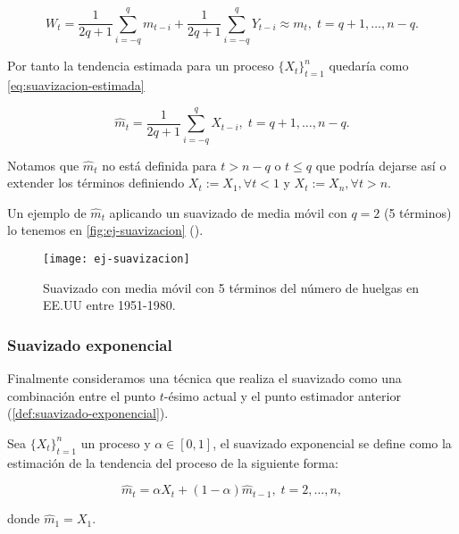\begin{equation}
  W_t = \dfrac{1}{2q + 1} \sum \limits^q_{i = -q} m_{t - i} + \dfrac{1}{2q + 1} \sum \limits^q_{i = -q} Y_{t - i} \approx m_t, \; t = q + 1, \ldots, n - q.
  \label{eq:suavizacion}
\end{equation}

Por tanto la tendencia estimada para un proceso $\{X_t\}_{t = 1}^n$ quedaría como \eqref{eq:suavizacion-estimada}

\begin{equation}
  \hat{m}_t = \dfrac{1}{2q + 1} \sum \limits^q_{i = -q} X_{t - i}, \; t = q + 1, \ldots, n - q.
  \label{eq:suavizacion-estimada}
\end{equation}

Notamos que $\hat{m}_t$ no está definida para $t > n - q$ o $t \leq q$ que podría dejarse así o extender los términos definiendo $X_t := X_1, \forall t < 1$ y $X_t := X_n, \forall t > n$.

Un ejemplo de $\hat{m}_t$ aplicando un suavizado de media móvil con $q = 2$ (5 términos) lo tenemos en \autoref{fig:ej-suavizacion} (\cite{brockwell2002introduction}).

\begin{figure}[htpb]
  \centering
  \texttt{[image: ej-suavizacion]}
  \caption{Suavizado con media móvil con 5 términos del número de huelgas en EE.UU entre 1951-1980.}
  \label{fig:ej-suavizacion}
\end{figure}

\subsubsection{Suavizado exponencial}

Finalmente consideramos una técnica que realiza el suavizado como una combinación entre el punto $t$-ésimo actual y el punto estimador anterior (\autoref{def:suavizado-exponencial}).

\begin{definicion}
  Sea $\{X_t\}_{t = 1}^n$ un proceso y $\alpha \in [0, 1]$, el suavizado exponencial se define como la estimación de la tendencia del proceso de la siguiente forma:

  $$\hat{m}_t = \alpha X_t + (1 - \alpha)\hat{m}_{t - 1}, \; t = 2, \ldots, n,$$

  donde $\hat{m}_1 = X_1$.
  \label{def:suavizado-exponencial}
\end{definicion}

